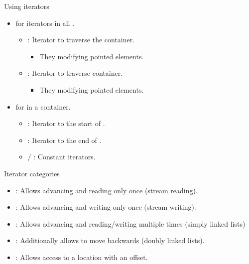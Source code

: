 \begin{frame}[t,fragile]{Using iterators}
\begin{itemize}
  \item {} for iterators in all
        .
    \begin{itemize}
      \item {}: Iterator to traverse the container.
        \begin{itemize}
          \item They  modifying pointed elements.
        \end{itemize}
      \item {}: Iterator to traverse container.
        \begin{itemize}
          \item They  modifying pointed elements.
        \end{itemize}
    \end{itemize}

  \item {} for  in a container.
    \begin{itemize}
      \item {}: Iterator to the start of .
      \item {}: Iterator to the end of .
      \item {} / : Constant iterators.
    \end{itemize}
\end{itemize}
\end{frame}

\begin{frame}[t,fragile]{Iterator categories}
\begin{itemize}
  \item {}:
        Allows advancing and reading only once (stream reading).
  \item {}:
        Allows advancing and writing only once (stream writing).
  \item {}:
        Allows advancing and reading/writing multiple times
        (simply linked lists)
  \item {}:
        Additionally allows to move backwards (doubly linked lists).
  \item {}:
        Allows access to a location with an offset.
\end{itemize}
\end{frame}

